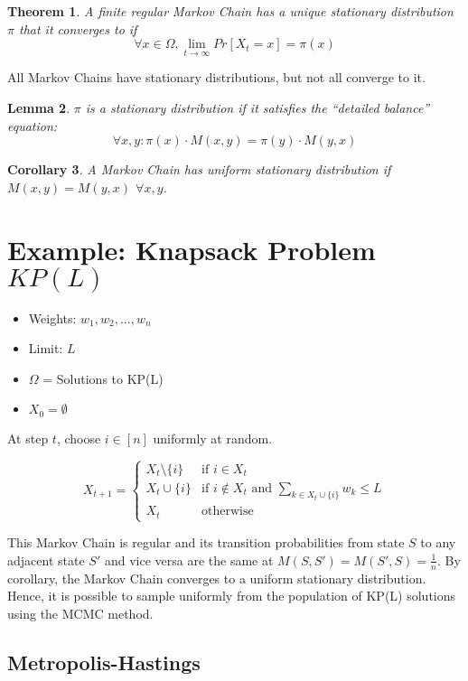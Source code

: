 \documentclass[twoside]{article}
\newcounter{lecnum}
\newtheorem{theorem}{Theorem}[lecnum]
\newtheorem{lemma}[theorem]{Lemma}
\newtheorem{corollary}[theorem]{Corollary}
\begin{document}
\begin{theorem}
   A finite regular Markov Chain has a unique stationary distribution $\pi$ that it converges to if
   $$
   \forall x \in \Omega, \lim_{t \rightarrow \infty} Pr[X_t = x] = \pi(x)
   $$
\end{theorem}

All Markov Chains have stationary distributions, but not all converge to it.

\begin{lemma}
   $\pi$ is a stationary distribution if it satisfies the ``detailed balance'' equation:
   $$
   \forall x,y: \pi(x) \cdot M(x, y) = \pi(y) \cdot M(y, x)
   $$
\end{lemma}

\begin{corollary}
   A Markov Chain has uniform stationary distribution if $M(x, y) = M(y, x)$ $\forall x, y$.
\end{corollary}

\section{Example: Knapsack Problem $KP(L)$}

\begin{itemize}
   \item Weights: $w_1,w_2, ..., w_n$
   \item Limit: $L$
   \item $\Omega$ = Solutions to KP(L)
   \item $X_0 = \emptyset$
\end{itemize}

At step $t$, choose $i \in [n]$ uniformly at random.

$$
X_{t+1} = \begin{cases}
   X_t \setminus \{i\} & \text{if } i \in X_t \\
   X_t \cup \{i\} & \text{if } i \notin X_t \text{ and } \sum_{k \in X_t \cup \{i\}} w_k \leq L\\
   X_t & \text{otherwise}
\end{cases}
$$

This Markov Chain is regular and its transition probabilities from state $S$ to any adjacent state $S'$ and vice versa are the same at $M(S, S') = M(S', S) = \frac{1}{n}$. By corollary, the Markov Chain converges to a uniform stationary distribution. Hence, it is possible to sample uniformly from the population of KP(L) solutions using the MCMC method.

\subsection{Metropolis-Hastings}
\end{document}
